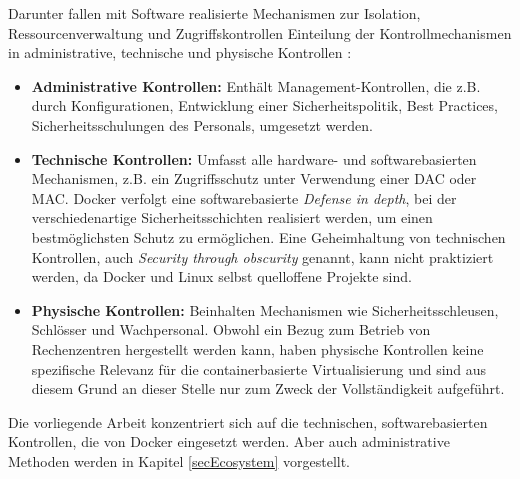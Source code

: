 \documentclass[../main.tex]{subfiles}
\begin{document}
  Darunter fallen mit Software realisierte Mechanismen zur Isolation, Ressourcenverwaltung und Zugriffskontrollen
  Einteilung der Kontrollmechanismen in administrative, technische und physische Kontrollen \cite[S.40]{CISSP}:

  \begin{itemize}
    \item \textbf{Administrative Kontrollen:} Enthält Management-Kontrollen, die z.B. durch Konfigurationen, Entwicklung einer Sicherheitspolitik, Best Practices, Sicherheitsschulungen des Personals, umgesetzt werden.
    \item \textbf{Technische Kontrollen:} Umfasst alle hardware- und softwarebasierten Mechanismen, z.B. ein Zugriffsschutz unter Verwendung einer DAC oder MAC. Docker verfolgt eine softwarebasierte \emph{Defense in depth}, bei der verschiedenartige Sicherheitsschichten realisiert werden, um einen bestmöglichsten Schutz zu ermöglichen. Eine Geheimhaltung von technischen Kontrollen, auch \emph{Security through obscurity} genannt, kann nicht praktiziert werden, da Docker und Linux selbst quelloffene Projekte sind.
    \item \textbf{Physische Kontrollen:} Beinhalten Mechanismen wie Sicherheitsschleusen, Schlösser und Wachpersonal. Obwohl ein Bezug zum Betrieb von Rechenzentren hergestellt werden kann, haben physische Kontrollen keine spezifische Relevanz für die containerbasierte Virtualisierung und sind aus diesem Grund an dieser Stelle nur zum Zweck der Vollständigkeit aufgeführt.
  \end{itemize}

  Die vorliegende Arbeit konzentriert sich auf die technischen, softwarebasierten Kontrollen, die von Docker eingesetzt werden. Aber auch administrative Methoden werden in Kapitel \ref{secEcosystem} vorgestellt.


\end{document}
